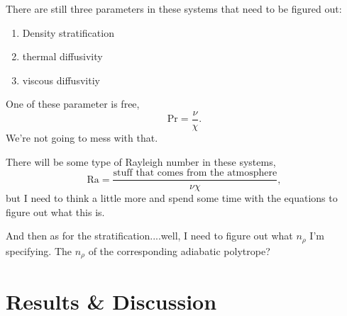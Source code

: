 \documentclass[aps, pre, onecolumn, nofootinbib, notitlepage, groupedaddress, amsfonts, amssymb, amsmath, longbibliography]{revtex4-1}
\begin{document}
There are still three parameters in these systems that need to be figured out:
\begin{enumerate}
\item Density stratification
\item thermal diffusivity
\item viscous diffusvitiy
\end{enumerate}
One of these parameter is free,
\begin{equation}
\text{Pr} = \frac{\nu}{\chi}.
\end{equation}
We're not going to mess with that.

There will be some type of Rayleigh number in these systems,
\begin{equation}
\text{Ra} = \frac{\text{stuff that comes from the atmosphere}}{\nu \chi},
\end{equation}
but I need to think a little more and spend some time with the equations to
figure out what this is.

And then as for the stratification....well, I need to figure out what $n_{\rho}$ I'm specifying.
The $n_\rho$ of the corresponding adiabatic polytrope?  

\section{Results \& Discussion}
\label{sec:results}


\end{document}

